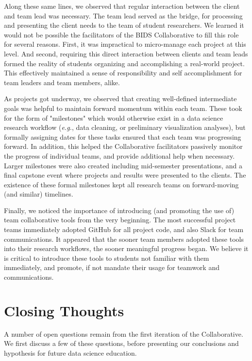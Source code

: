 \documentclass{sig-alternate}
\begin{document}
Along these same lines, we observed that regular interaction between the client and team lead was necessary. The team lead served as the bridge, for processing and presenting the client needs to the team of student researchers.  We learned it would not be possible the facilitators of the BIDS Collaborative to fill this role for several reasons.  First, it was impractical to micro-manage each project at this level.  And second, requiring this direct interaction between clients and team leads formed the reality of students organizing and accomplishing a real-world project.  This effectively maintained a sense of responsibility and self accomplishment for team leaders and team members, alike.

As projects got underway, we observed that creating well-defined intermediate goals was helpful to maintain forward momentum within each team.  These took for the form of "milestones" which would otherwise exist in a data science research workflow (\emph{e.g.}, data cleaning, or preliminary visualization analyses), but formally assigning dates for these tasks ensured that each team was progressing forward.  In addition, this helped the Collaborative facilitators passively monitor the progress of individual teams, and provide additional help when necessary.  Larger milestones were also created including mid-semester presentations, and a final capstone event where projects and results were presented to the clients.  The existence of these formal milestones kept all research teams on forward-moving (and similar) timelines.

Finally, we noticed the importance of introducing (and promoting the use of) team collaborative tools from the very beginning.  The most successful project teams immediately adopted GitHub for all project code, and also Slack for team communications.  It appeared that the sooner team members adopted these tools into their research workflows, the sooner meaningful progress began.  We believe it is critical to introduce these tools to students not familiar with them immediately, and promote, if not mandate their usage for teamwork and communications.




\section{Closing Thoughts}

A number of open questions remain from the first iteration of the Collaborative.  We first discuss a few of these questions, before presenting our conclusions and hypothesis for future data science education.
\end{document}

